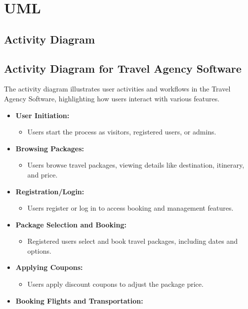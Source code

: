 \documentclass{scrreprt}
\begin{document}
\chapter{UML}
\section{Activity Diagram}

\section*{Activity Diagram for Travel Agency Software}

The activity diagram illustrates user activities and workflows in the Travel Agency Software, highlighting how users interact with various features.

\begin{itemize}
    \item \textbf{User Initiation:}
    \begin{itemize}
        \item Users start the process as visitors, registered users, or admins.
    \end{itemize}
    \item \textbf{Browsing Packages:}
    \begin{itemize}
        \item Users browse travel packages, viewing details like destination, itinerary, and price.
    \end{itemize}
    \item \textbf{Registration/Login:}
    \begin{itemize}
        \item Users register or log in to access booking and management features.
    \end{itemize}
    \item \textbf{Package Selection and Booking:}
    \begin{itemize}
        \item Registered users select and book travel packages, including dates and options.
    \end{itemize}
    \item \textbf{Applying Coupons:}
    \begin{itemize}
        \item Users apply discount coupons to adjust the package price.
    \end{itemize}
    \item \textbf{Booking Flights and Transportation:}

\end{itemize}
\end{document}
